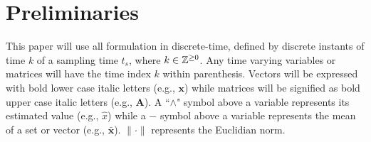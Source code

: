 
\section{Preliminaries} \label{sec:preliminaries}

This paper will use all formulation in discrete-time, defined by discrete instants of time $k$ of a sampling time $t_s$, where $k \in \mathbb{Z}^{\geq0}$. Any time varying variables or matrices will have the time index $k$ within parenthesis. Vectors will be expressed with bold lower case italic letters (e.g., $\bm{x}$) while matrices will be signified as bold upper case italic letters (e.g., $\bm{A}$). A ``$\wedge$" symbol above a variable represents its estimated value (e.g., $\hat{x}$) while a $-$ symbol above a variable represents the mean of a set or vector (e.g., $\bar{\bm{x}}$). $\lVert\cdot\rVert$ represents the Euclidian norm.

